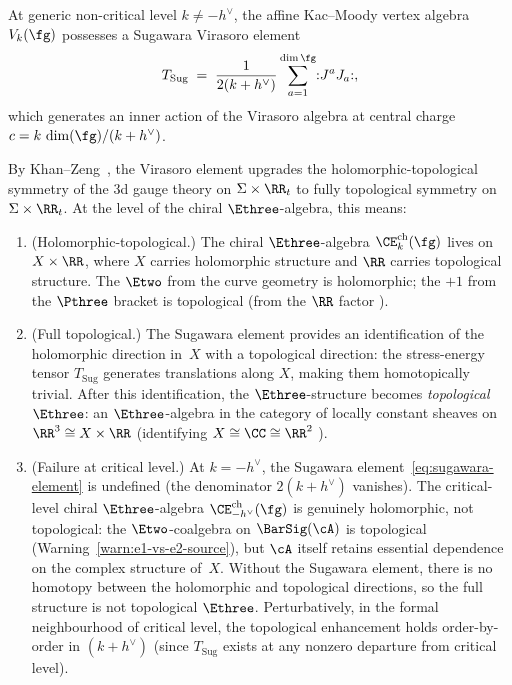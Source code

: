 \begin{proposition}
\label{prop:khan-zeng-topological}
At generic non-critical level $k \neq -h^\vee$, the affine
Kac--Moody vertex algebra $V_k(\fg)$ possesses a Sugawara
Virasoro element
\begin{equation}\label{eq:sugawara-element}
  T_{\mathrm{Sug}} \;=\;
  \frac{1}{2(k + h^\vee)}
  \sum_{a=1}^{\dim \fg}
  \mathopen{:} J^a J_a \mathclose{:},
\end{equation}
which generates an inner action of the Virasoro algebra at
central charge $c = k\,\dim(\fg)/(k + h^\vee)$.

By Khan--Zeng~\cite{KhanZeng25}, the Virasoro element
upgrades the holomorphic-topological symmetry of the $3$d
gauge theory on $\Sigma \times \RR_t$ to fully topological
symmetry on $\Sigma \times \RR_t$. At the level of the
chiral $\Ethree$-algebra, this means:
\begin{enumerate}[label=\textup{(\roman*)}]
\item \textup{(Holomorphic-topological.)}
  The chiral $\Ethree$-algebra
  $\CE^{\mathrm{ch}}_k(\fg)$ lives on $X \times \RR$,
  where $X$ carries holomorphic structure and $\RR$
  carries topological structure. The $\Etwo$ from the
  curve geometry is holomorphic; the $+1$ from the $\Pthree$
  bracket is topological \textup{(}from the $\RR$ factor%
  \textup{)}.
\item \textup{(Full topological.)}
  The Sugawara element provides an identification
  of the holomorphic direction in~$X$ with a topological
  direction: the stress-energy tensor $T_{\mathrm{Sug}}$
  generates translations along $X$, making them homotopically
  trivial. After this identification, the
  $\Ethree$-structure becomes \emph{topological} $\Ethree$:
  an $\Ethree$-algebra in the category of locally constant
  sheaves on $\RR^3 \cong X \times \RR$
  \textup{(}identifying $X \cong \CC \cong \RR^2$%
  \textup{)}.
\item \textup{(Failure at critical level.)}
  At $k = -h^\vee$, the Sugawara element~\eqref{eq:sugawara-element}
  is undefined \textup{(}the denominator $2(k+h^\vee)$
  vanishes\textup{)}. The critical-level chiral
  $\Ethree$-algebra $\CE^{\mathrm{ch}}_{-h^\vee}(\fg)$ is
  genuinely holomorphic, not topological: the
  $\Etwo$-coalgebra on $\BarSig(\cA)$ is topological
  (Warning~\ref{warn:e1-vs-e2-source}), but $\cA$
  itself retains essential dependence on the complex
  structure of~$X$.
  Without the Sugawara element, there is no homotopy
  between the holomorphic and topological directions,
  so the full structure is not topological $\Ethree$.
  Perturbatively, in the formal neighbourhood of critical level,
  the topological enhancement holds order-by-order in
  $(k + h^\vee)$ \textup{(}since $T_{\mathrm{Sug}}$ exists at
  any nonzero departure from critical level\textup{)}.
\end{enumerate}
\end{proposition}

